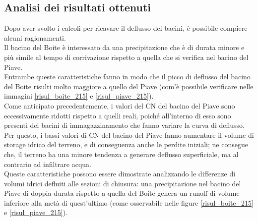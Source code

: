 \subsection{Analisi dei risultati ottenuti}
Dopo aver svolto i calcoli per ricavare il deflusso dei bacini, è possibile compiere alcuni ragionamenti.\\
Il bacino del Boite è interessato da una precipitazione che è di durata minore e più simile al tempo di corrivazione rispetto a quella che si verifica nel bacino del Piave.\\
Entrambe queste caratteristiche fanno in modo che il picco di deflusso del bacino del Boite risulti molto maggiore a quello del Piave (com'è possibile verificare nelle immagini \ref{risul_boite_215} e \ref{risul_piave_215}).\\
Come anticipato precedentemente, i valori del CN del bacino del Piave sono eccessivamente ridotti rispetto a quelli reali, poiché all'interno di esso sono presenti dei bacini di immagazzinamento che fanno variare la curva di deflusso.\\
Per questo, i bassi valori di CN del bacino del Piave fanno aumentare il volume di storage idrico del terreno, e di conseguenza anche le perdite iniziali; ne consegue che, il terreno ha una minore tendenza a generare deflusso superficiale, ma al contrario ad infiltrare acqua.\\
Queste caratteristiche possono essere dimostrate analizzando le differenze di volumi idrici defluiti alle sezioni di chiusura: una precipitazione nel bacino del Piave di doppia durata rispetto a quella del Boite genera un runoff di volume inferiore alla metà di quest'ultimo (come osservabile nelle figure \ref{risul_boite_215} e \ref{risul_piave_215}).